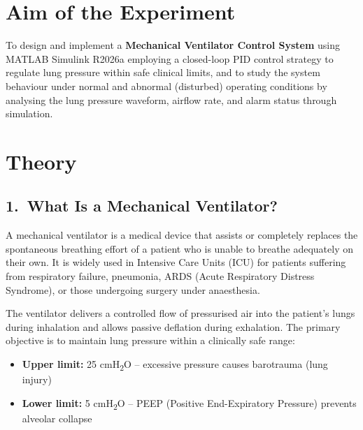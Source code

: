 \documentclass[12pt,a4paper]{article}
\begin{document}
\newpage
\setcounter{page}{1}
\onehalfspacing

\section{Aim of the Experiment}

To design and implement a \textbf{Mechanical Ventilator Control System} using MATLAB Simulink R2026a employing a closed-loop PID control strategy to regulate lung pressure within safe clinical limits, and to study the system behaviour under normal and abnormal (disturbed) operating conditions by analysing the lung pressure waveform, airflow rate, and alarm status through simulation.

\section{Theory}

\subsection*{1.\ What Is a Mechanical Ventilator?}

A mechanical ventilator is a medical device that assists or completely replaces the spontaneous breathing effort of a patient who is unable to breathe adequately on their own. It is widely used in Intensive Care Units (ICU) for patients suffering from respiratory failure, pneumonia, ARDS (Acute Respiratory Distress Syndrome), or those undergoing surgery under anaesthesia.

The ventilator delivers a controlled flow of pressurised air into the patient's lungs during inhalation and allows passive deflation during exhalation. The primary objective is to maintain lung pressure within a clinically safe range:
\begin{itemize}
  \item \textbf{Upper limit:} 25 cmH\textsubscript{2}O -- excessive pressure causes barotrauma (lung injury)
  \item \textbf{Lower limit:} 5 cmH\textsubscript{2}O -- PEEP (Positive End-Expiratory Pressure) prevents alveolar collapse
\end{itemize}
\end{document}

